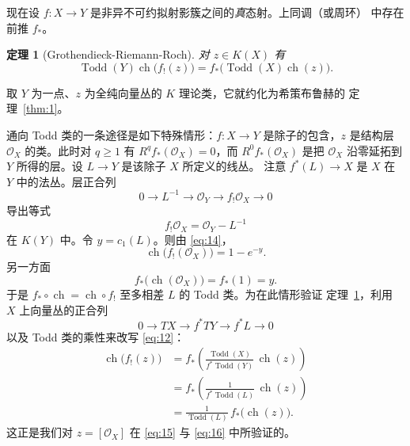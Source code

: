 \documentclass[11pt]{amsart}
\theoremstyle{definition}
\theoremstyle{remark}
\theoremstyle{plain}
\newtheorem{theorem}[equation]{定理}
\numberwithin{equation}{section}
\renewcommand{\:}{\colon}
\DeclareMathOperator{\ch}{ch}
\newcommand{\inv}{^{-1}}
\DeclareMathOperator{\Todd}{Todd}
\newcommand{\sO}{\mathcal{O}}
\begin{document}

现在设 $f\:X\to Y$ 是非异不可约拟射影簇之间的{\it 真}态射。上同调（或周环）
中存在前推 $f_*$。

\begin{theorem}[Grothendieck-Riemann-Roch]\label{thm:4}
对 $z\in K(X)$ 有
  \begin{equation}\label{eq:12}
     \Todd(Y)\ch\bigl(f_!(z)\bigr)  = f_*\bigl( \Todd(X)\ch(z)\bigr).
  \end{equation}
\end{theorem}

\noindent
取 $Y$ 为一点、$z$ 为全纯向量丛的 $K$ 理论类，它就约化为希策布鲁赫的
定理~\ref{thm:1}。

通向 Todd 类的一条途径是如下特殊情形：$f\:X\to Y$ 是除子的包含，$z$ 是结构层
$\sO_X$ 的类。此时对 $q\ge 1$ 有 $R^qf_*(\sO_X)=0$，而 $R^0f_*(\sO_X)$ 是把
$\sO_X$ 沿零延拓到 $Y$ 所得的层。设 $L\to Y$ 是该除子 $X$ 所定义的线丛。
注意 $f^*(L)\to X$ 是 $X$ 在 $Y$ 中的法丛。层正合列
  \begin{equation}\label{eq:13}
     0 \longrightarrow L\inv \longrightarrow \sO_Y \longrightarrow
     f_!\sO_X \longrightarrow 0
  \end{equation}
导出等式
  \begin{equation}\label{eq:14}
     f_!\sO_X = \sO_Y - L\inv
  \end{equation}
在 $K(Y)$ 中。令 $y=c_1(L)$。则由 \eqref{eq:14}，
  \begin{equation}\label{eq:15}
     \ch\bigl( f_!(\sO_X)\bigr) = 1 - e^{-y}.
  \end{equation}
另一方面
  \begin{equation}\label{eq:16}
     f_*\bigl(\ch(\sO_X)\bigr) = f_*(1) = y.
  \end{equation}
于是 $f_*\circ \ch = \ch \circ f_!$ 至多相差 $L$ 的 Todd 类。为在此情形验证
定理~\ref{thm:4}，利用 $X$ 上向量丛的正合列
  \begin{equation}\label{eq:127}
     0\longrightarrow TX\longrightarrow f^*TY\longrightarrow
     f^*L\longrightarrow 0
  \end{equation}
以及 Todd 类的乘性来改写 \eqref{eq:12}：
  \begin{equation}\label{eq:128}
     \begin{split} \ch\bigl(f_!(z) \bigr) &= f_*\left(
      \frac{\Todd(X)}{f^*\Todd(Y)}\,\ch(z) \right) \\ &= f_*\left(
      \frac{1}{f^*\Todd(L)}\,\ch(z) \right) \\ &=
      \frac{1}{\Todd(L)}\,f_*\bigl(\ch(z) \bigr).\end{split}
  \end{equation}
这正是我们对 $z=[\sO_X]$ 在 \eqref{eq:15} 与 \eqref{eq:16} 中所验证的。
\end{document}
